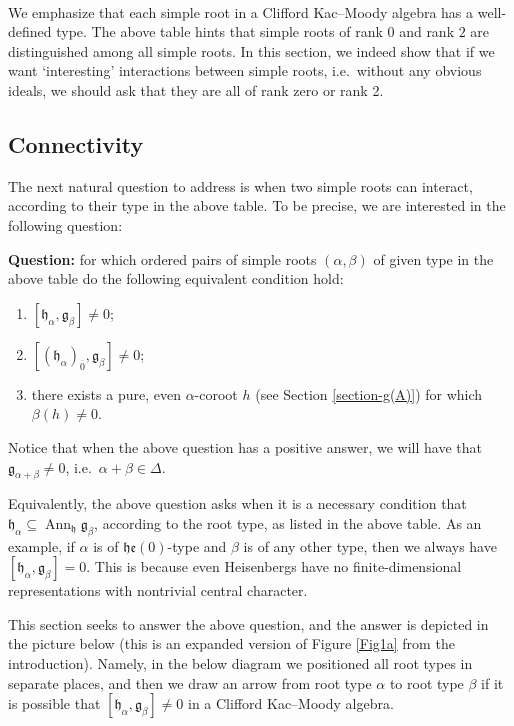 \documentclass[12pt, a4paper, reqno]{amsart}
\def\e{\mathfrak{e}}
\def\g{\mathfrak{g}}
\def\h{\mathfrak{h}}
\def\ol{\overline}
\theoremstyle{definition}
\theoremstyle{definition}
\theoremstyle{definition}
\numberwithin{theorem}{section}
\numberwithin{lemma}{section}
\numberwithin{remark}{section}
\numberwithin{definition}{section}
\numberwithin{corollary}{section}
\numberwithin{proposition}{section}
\numberwithin{example}{section}
\begin{document}
	\
	
	We emphasize that each simple root in a Clifford Kac--Moody algebra has a well-defined type. The above table hints that simple roots of rank \(0\) and rank \(2\) are distinguished among all simple roots. In this section, we indeed show that if we want `interesting' interactions between simple roots, i.e.~without any obvious ideals, we should ask that they are all of rank zero or rank 2.
	
	\subsection{Connectivity}\label{section_connectivity} The next natural question to address is when two simple roots can interact, according to their type in the above table.  To be precise, we are interested in the following question:
	
	\textbf{Question:} for which ordered pairs of simple roots $(\alpha,\beta)$ of given type in the above table do the following equivalent condition hold:
	\begin{enumerate}
		\item $[\h_{\alpha},\g_{\beta}]\neq0$;
		\item $[(\h_{\alpha})_{\ol{0}},\g_{\beta}]\neq0$;
		\item there exists a pure, even $\alpha$-coroot $h$ (see Section \ref{section-g(A)}) for which $\beta(h)\neq0$.
	\end{enumerate}    
	
	Notice that when the above question has a positive answer, we will have that $\g_{\alpha+\beta}\neq0$, i.e.~$\alpha+\beta\in\Delta$.
	
	Equivalently, the above question asks when it is a necessary condition that $\h_{\alpha}\subseteq\operatorname{Ann}_{\h}\g_{\beta}$, according to the root type, as listed in the above table.  As an example, if $\alpha$ is of $\h\e(0)$-type and $\beta$ is of any other type, then we always have $[\h_{\alpha},\g_{\beta}]=0$.  This is because even Heisenbergs have no finite-dimensional representations with nontrivial central character.
	
	This section seeks to answer the above question, and the answer is depicted in the picture below (this is an expanded version of Figure \ref{Fig1a} from the introduction).  Namely, in the below diagram we positioned all root types in separate places, and then we draw an arrow from root type $\alpha$ to root type $\beta$ if it is possible that $[\h_{\alpha},\g_{\beta}]\neq0$ in a Clifford Kac--Moody algebra.
	
\end{document}
